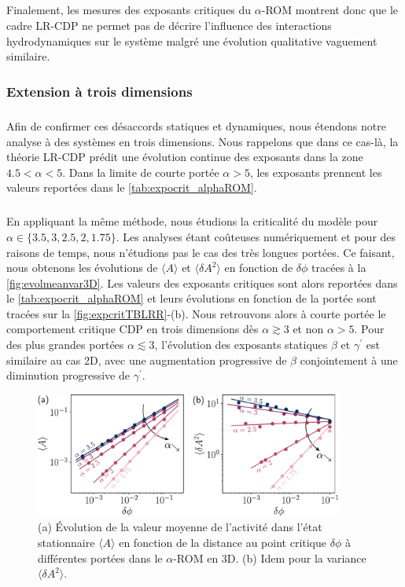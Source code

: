 \subparagraph{}Finalement, les mesures des exposants critiques du $\alpha$-ROM montrent donc que le cadre LR-CDP ne permet pas de décrire l'influence des interactions hydrodynamiques sur le système malgré une évolution qualitative vaguement similaire.

\subsubsection{Extension à trois dimensions}

\subparagraph{}Afin de confirmer ces désaccords statiques et dynamiques, nous étendons notre analyse à des systèmes en trois dimensions. Nous rappelons que dans ce cas-là, la théorie LR-CDP prédit une évolution continue des exposants dans la zone $4.5<\alpha<5$. Dans la limite de courte portée $\alpha>5$, les exposants prennent les valeurs reportées dans le \autoref{tab:expocrit_alphaROM}.

\subparagraph{}En appliquant la même méthode, nous étudions la criticalité du modèle pour $\alpha \in \{3.5, 3, 2.5, 2, 1.75\}$. Les analyses étant coûteuses numériquement et pour des raisons de temps, nous n'étudions pas le cas des très longues portées. Ce faisant, nous obtenons les évolutions de $\langle A \rangle$ et $\langle\delta A^2\rangle$ en fonction de $\delta\phi$ tracées à la \autoref{fig:evolmeanvar3D}. Les valeurs des exposants critiques sont alors reportées dans le \autoref{tab:expocrit_alphaROM} et leurs évolutions en fonction de la portée sont tracées sur la \autoref{fig:expcritTBLRR}-(b). Nous retrouvons alors à courte portée le comportement critique CDP en trois dimensions dès $\alpha \gtrsim 3$ et non $\alpha>5$. Pour des plus grandes portées $\alpha\lesssim 3$, l'évolution des exposants statiques $\beta$ et $\gamma^\prime$ est similaire au cas 2D, avec une augmentation progressive de $\beta$ conjointement à une diminution progressive de $\gamma^\prime$.

\begin{figure}[h]
	\centering
	\includegraphics[width=0.9\textwidth]{Chapitre3/Figures/BetaGamma/EvolMeanVar3D_edited.pdf}
	\caption{(a) Évolution de la valeur moyenne de l'activité dans l'état stationnaire $\langle A \rangle$ en fonction de la distance au point critique $\delta\phi$ à différentes portées dans le $\alpha$-ROM en 3D. (b) Idem pour la variance $\langle \delta A^2 \rangle$.}
	\label{fig:evolmeanvar3D}
\end{figure}

